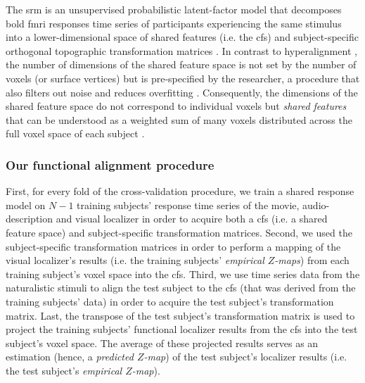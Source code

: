 



The \ac{srm} is an unsupervised probabilistic latent-factor model that
decomposes \ac{bold} \ac{fmri} responses time series of participants
experiencing the same stimulus into a lower-dimensional space of shared features
(i.e. the \ac{cfs}) and subject-specific orthogonal topographic transformation
matrices \citep{kumar2020brainiak, cohen2017computational}.
%
In contrast to hyperalignment \citep{haxby2011common, guntupalli2016model}, the
number of dimensions of the shared feature space is not set by the number of
voxels (or surface vertices) but is pre-specified by the researcher, a procedure
that also filters out noise and reduces overfitting \citep{chen2015reduced}.
%
Consequently, the dimensions of the shared feature space do not correspond to
individual voxels but \textit{shared features} that can be understood as a
weighted sum of many voxels distributed across the full voxel space of each
subject \citep{kumar2020brainiak}.


\subsubsection{Our functional alignment procedure}

First, for every fold of the cross-validation procedure, we train a shared
response model on $N-1$ training subjects' response time series of the movie,
audio-description and visual localizer in order to acquire both a \ac{cfs} (i.e.
a shared feature space) and subject-specific transformation matrices.
Second, we used the subject-specific transformation matrices in order to perform
a mapping of the visual localizer's results (i.e. the training subjects'
\textit{empirical $Z$-maps}) from each training subject's voxel space into the
\ac{cfs}.
Third, we use time series data from the naturalistic stimuli to align the test
subject to the \ac{cfs} (that was derived from the training subjects' data) in
order to acquire the test subject's transformation matrix.
Last, the transpose of the test subject's transformation matrix is used to
project the training subjects' functional localizer results from the \ac{cfs}
into the test subject's voxel space.
The average of these projected results serves as an estimation (hence, a
\textit{predicted $Z$-map}) of the test subject's localizer results (i.e. the
test subject's \textit{empirical $Z$-map}).


